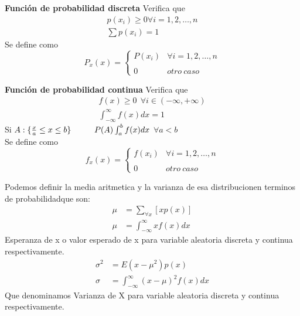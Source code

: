 \documentclass[10pt,a4paper]{article}
\begin{document}
\textbf{Función de probabilidad discreta} Verifica que
\begin{align}
	p(x_i)\geq 0 \forall i = 1,2,\dots,n\\
	\sum p(x_i)=1 	
\end{align}
Se define como
\begin{equation}
	P_x(x)= \left\{ \begin{array}{lcc}
		P(x_i) &   \forall i = 1,2,\dots,n \\
		\\ 0 &  otro\ caso \end{array}
\right.
\end{equation}

\textbf{Función de probabilidad continua}
Verifica que 
\begin{align}
	f(x)\geq 0 \ \ \forall i \in (-\infty,+\infty)\\
	\int_{-\infty}^{\infty} f(x)dx=1 	
\end{align}
Si $A:\{\frac{x}{a}\leq x \leq b\} \hspace{10mm}P(A)\int_{a}^{b}f(x)dx$ $\forall a<b$\\

Se define como
\begin{equation}
	f_x(x)= \left\{ \begin{array}{lcc}
		f(x_i) &   \forall i = 1,2,\dots,n \\
		\\ 0 &  otro\ caso \end{array}
\right.
\end{equation}

Podemos definir la media aritmetica y la varianza de esa distribucionen terminos de probabilidadque son:
\begin{align}
	\mu&=\sum_{\forall x}\left[xp(x)\right]\\
	\mu&=\int_{-\infty}^{\infty}xf(x)dx
\end{align}
Esperanza de x o valor esperado de x para variable aleatoria discreta y continua respectivamente.
\begin{align}
	\sigma^2&=E(x-\mu^2)p(x)\\
	\sigma&=\int_{-\infty}^{\infty}(x-\mu)^2f(x)dx
\end{align}
Que denominamos Varianza de X para variable aleatoria discreta y continua respectivamente.\\
\end{document}
